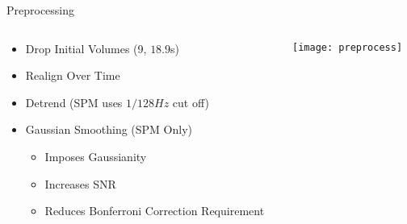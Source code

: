 \begin{frame}{Preprocessing}
  \begin{columns}
    \begin{column}{.6\textwidth}
        \begin{itemize}
            \item Drop Initial Volumes (9, $18.9$s)
            \item Realign Over Time
            \item Detrend (SPM uses $1/128 Hz$ cut off)
            \item Gaussian Smoothing (SPM Only)
            \begin{itemize}
                \item Imposes Gaussianity
                \item Increases SNR
                \item Reduces Bonferroni Correction Requirement
            \end{itemize}
        \end{itemize}
    \end{column}
    
    \begin{column}{.4\textwidth}
        \texttt{[image: preprocess]}
    \end{column}
  \end{columns}
\end{frame}

